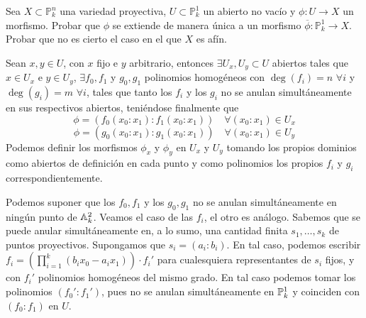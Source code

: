 \documentclass[twoside]{article}
\begin{document}
\begin{ejercicio}{2} Sea $X \subset \mathbb{P}^n_k$ una variedad proyectiva, $U\subset \mathbb{P}^1_k$ un abierto no vacío y $\phi\colon U\rightarrow X$ un morfismo. Probar que $\phi$ se extiende de manera única a un morfismo $\overline{\phi}\colon \mathbb{P}^1_k\rightarrow X$. Probar que no es cierto el caso en el que $X$ es afín.
\end{ejercicio}
\begin{solucion} 
Sean $x,y\in U$, con $x$ fijo e $y$ arbitrario, entonces $\exists U_x,U_y \subset U$ abiertos tales que $x\in U_x$ e $y\in U_y$, $\exists f_0,f_1$ y $g_0,g_1$ polinomios homogéneos con $\deg(f_i)=n$ $\forall i$ y $\deg(g_i)=m$ $\forall i$, tales que tanto los $f_i$ y los $g_i$ no se anulan simultáneamente en sus respectivos abiertos, teniéndose finalmente que 
$$\phi =(f_0(x_0:x_1):f_1(x_0:x_1)) \quad \forall (x_0:x_1) \in U_x$$ 
$$\phi = (g_0(x_0:x_1):g_1(x_0:x_1)) \quad \forall (x_0:x_1) \in U_y$$
Podemos definir los morfismos $\phi_x$ y $\phi_y$ en $U_x$ y $U_y$ tomando  los propios dominios como abiertos de definición en cada punto y como polinomios los propios $f_i$ y $g_i$ correspondientemente. 

Podemos suponer que los $f_0,f_1$ y los $g_0,g_1$ no se anulan simultáneamente en ningún punto de $\mathbb{A}^2_k$. Veamos el caso de las $f_i$, el otro es análogo. Sabemos que se puede anular simultáneamente en, a lo sumo, una cantidad finita $s_1,\dotsc,s_k$ de puntos proyectivos. Supongamos que $s_i = (a_i:b_i)$. En tal caso, podemos escribir $f_i = \left(\prod_{i=1}^k (b_ix_0-a_ix_1)\right)\cdot f_i'$ para cualesquiera representantes de $s_i$ fijos, y con $f_i'$ polinomios homogéneos del mismo grado. En tal caso podemos tomar los polinomios $(f_0':f_1')$, pues no se anulan simultáneamente en $\mathbb{P}^1_k$ y coinciden con $(f_0:f_1)$ en $U$. 


\end{solucion}
\end{document}
